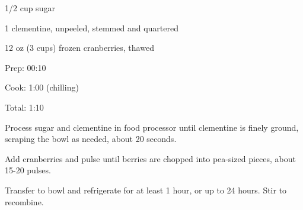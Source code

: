 \documentclass[oneside]{book}  %
\def\thisrecipe{}  %
\newcommand{\recipe}[1]{\section{#1}\def\thisrecipe{: #1}} %
\begin{document}
\begin{IT}[0.770]
  \begin{ingredients}
    \item[1/2 cup] sugar
    \item[1] clementine, unpeeled, stemmed and quartered
    \item[12 oz (3 cups)] frozen cranberries, thawed
  \end{ingredients}

  \switchcolumn

  \begin{timeline}
    \item[Prep:]  00:10
    \item[Cook:]  1:00 (chilling)
    \item[Total:] 1:10
  \end{timeline}
\end{IT}

\begin{directions}
  \item Process sugar and clementine in food processor until clementine is
  finely ground, scraping the bowl as needed, about 20 seconds.

  \item Add cranberries and pulse until berries are chopped into pea-sized
  pieces, about 15-20 pulses.

  \item Transfer to bowl and refrigerate for at least 1 hour, or up to 24 hours.
  Stir to recombine.
\end{directions}

\end{document}
